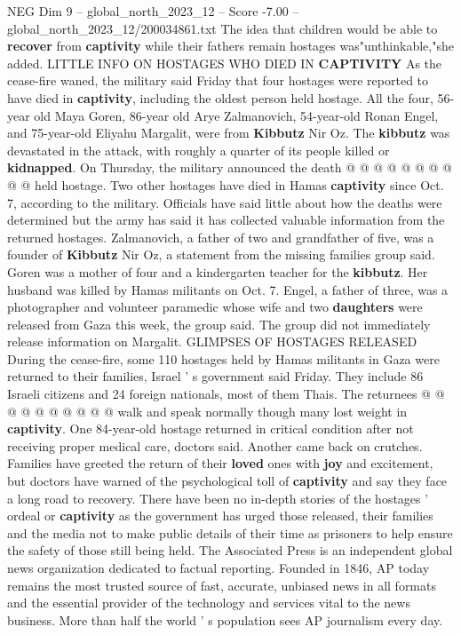 \begin{textsample}{NEG Dim 9 – global\_north\_2023\_12 – Score -7.00 – global\_north\_2023\_12/200034861.txt}
The idea that children would be able to \textbf{recover} from \textbf{captivity} while their fathers remain hostages was"unthinkable,"she added.
LITTLE INFO ON HOSTAGES WHO DIED IN \textbf{CAPTIVITY} As the cease-fire waned, the military said Friday that four hostages were reported to have died in \textbf{captivity}, including the oldest person held hostage.
All the four, 56-year old Maya Goren, 86-year old Arye Zalmanovich, 54-year-old Ronan Engel, and 75-year-old Eliyahu Margalit, were from \textbf{Kibbutz} Nir Oz.
The \textbf{kibbutz} was devastated in the attack, with roughly a quarter of its people killed or \textbf{kidnapped}.
On Thursday, the military announced the death @ @ @ @ @ @ @ @ @ @ held hostage.
Two other hostages have died in Hamas \textbf{captivity} since Oct. 7, according to the military.
Officials have said little about how the deaths were determined but the army has said it has collected valuable information from the returned hostages.
Zalmanovich, a father of two and grandfather of five, was a founder of \textbf{Kibbutz} Nir Oz, a statement from the missing families group said.
Goren was a mother of four and a kindergarten teacher for the \textbf{kibbutz}.
Her husband was killed by Hamas militants on Oct. 7.
Engel, a father of three, was a photographer and volunteer paramedic whose wife and two \textbf{daughters} were released from Gaza this week, the group said.
The group did not immediately release information on Margalit.
GLIMPSES OF HOSTAGES RELEASED During the cease-fire, some 110 hostages held by Hamas militants in Gaza were returned to their families, Israel ' s government said Friday.
They include 86 Israeli citizens and 24 foreign nationals, most of them Thais.
The returnees @ @ @ @ @ @ @ @ @ @ walk and speak normally though many lost weight in \textbf{captivity}.
One 84-year-old hostage returned in critical condition after not receiving proper medical care, doctors said.
Another came back on crutches.
Families have greeted the return of their \textbf{loved} ones with \textbf{joy} and excitement, but doctors have warned of the psychological toll of \textbf{captivity} and say they face a long road to recovery.
There have been no in-depth stories of the hostages ' ordeal or \textbf{captivity} as the government has urged those released, their families and the media not to make public details of their time as prisoners to help ensure the safety of those still being held.
The Associated Press is an independent global news organization dedicated to factual reporting.
Founded in 1846, AP today remains the most trusted source of fast, accurate, unbiased news in all formats and the essential provider of the technology and services vital to the news business.
More than half the world ' s population sees AP journalism every day.

\end{textsample}
